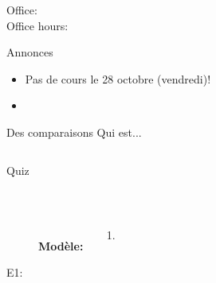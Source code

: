 \documentclass{beamer}
\subtitle[Heures et verbes \lexi{-ir}]{Les heures et les verbes \lexi{-ir}}
\begin{document}
  \begin{frame}
    \titlepage
    \tiny{Office: \\
          Office hours: }
  \end{frame}

  \begin{frame}{Annonces}
    \begin{itemize}
      \item Pas de cours le 28 octobre (vendredi)!
      \item[] 
    \end{itemize}
  \end{frame}

  \begin{frame}[t]{Des comparaisons}
    Qui est...
    \vspace{0.5cm}
    \begin{columns}
        \begin{center}
        \end{center}
        \begin{center}
        \end{center}
    \end{columns}
  \end{frame}

  \begin{frame}{}
    \begin{center}
      \Large Quiz
    \end{center}
  \end{frame}

  \begin{frame}{}
     \\
    \tinygloss{}
    \begin{columns}
        \begin{description}
          \item[] \textbf{Modèle:}
          \item[] 
          \item[E1:]
        \end{description}
        \begin{enumerate}
          \item
        \end{enumerate}
    \end{columns}
  \end{frame}
\end{document}
